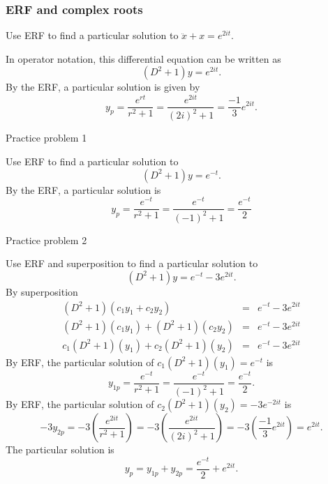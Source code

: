 \subsubsection{ERF and complex roots}

\begin{example}
  Use ERF to find a particular solution to $\ddot x + x = e^{2it}$.
\end{example}

\Solution In operator notation, this differential equation can be written as
\begin{equation*}
  (D^2+1)y = e^{2it}.
\end{equation*}
By the ERF, a particular solution is given by
\begin{equation*}
  y_ p = \frac{e^{rt}}{r^2+1} = \frac{e^{2it}}{(2i)^2+1} = \frac{-1}{3}e^{2it}.
\end{equation*}

\begin{exercise}
  Practice problem 1
\end{exercise}
Use ERF to find a particular solution to
\begin{equation*}
  (D^2+1)y = e^{-t}.
\end{equation*}
By the ERF, a particular solution is
\begin{equation*}
  y _p = \frac{e^{-t}}{r^2 + 1} = \frac{e^{-t}}{(-1)^2 + 1} = \frac{e^{-t}}{2} 
\end{equation*}

\begin{exercise}
  Practice problem 2
\end{exercise}
Use ERF and superposition to find a particular solution to
\begin{equation*}
  (D^2+1)y = e^{-t} - 3e^{2it} .
\end{equation*}
By superposition
\begin{eqnarray*}
  (D^2+1)(c_1 y_1 + c_2 y_2) &=& e^{-t} - 3e^{2it} \\
  (D^2+1)(c_1 y_1) + (D^2+1)(c_2 y_2) &=& e^{-t} - 3e^{2it} \\
  c_1 (D^2+1)(y_1) + c_2(D^2+1)(y_2) &=& e^{-t} - 3e^{2it}
\end{eqnarray*}
By ERF, the particular solution of $ c_1 (D^2+1)(y_1) = e^{-t}$ is
\begin{equation*}
  y_{1p} = \frac{e^{-t}}{r^2 + 1} = \frac{e^{-t}}{(-1)^2 + 1} = \frac{e^{-t}}{2}. 
\end{equation*}
By ERF, the particular solution of $ c_2 (D^2+1)(y_2) = -3 e^{-2it}$ is
\begin{equation*}
  -3 y_{2p} = -3 \left(\frac{e^{2it}}{r^2 + 1} \right)
  = -3 \left(\frac{e^{2it}}{(2i)^2 + 1} \right)
  = -3 \left(\frac{-1}{3} e^{2it} \right) = e^{2it}. 
\end{equation*}
The particular solution is
\begin{equation*}
  y _p = y_{1p} + y_{2p} =  \frac{e^{-t}}{2}  + e^{2it}. 
\end{equation*}

